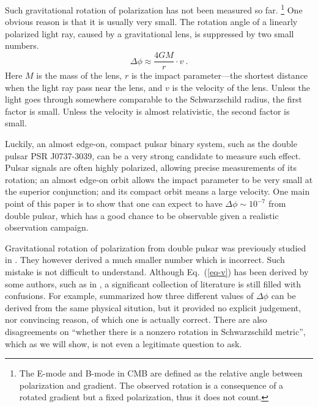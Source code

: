 \documentclass[aps,showpacs,onecolumn,floats,prd,superscriptaddress,nofootinbib]{revtex4}
\begin{document}
Such gravitational rotation of polarization has not been measured so far.
\footnote{The E-mode and B-mode in CMB are defined as the relative angle between polarization and gradient. 
The observed rotation is a consequence of a rotated gradient but a fixed polarization, thus it does not count.} 
One obvious reason is that it is usually very small. 
The rotation angle of a linearly polarized light ray, caused by a gravitational lens, is suppressed by two small numbers.
\begin{equation}
\Delta\phi \approx \frac{4GM}{r} \cdot v~.
\label{eq-v}
\end{equation}
Here $M$ is the mass of the lens, $r$ is the impact parameter---the shortest distance when the light ray pass near the lens, and $v$ is the velocity of the lens.  
Unless the light goes through somewhere comparable to the Schwarzschild radius, the first factor is small. 
Unless the velocity is almost relativistic, the second factor is small. 

Luckily, an almost edge-on, compact pulsar binary system, such as the double pulsar PSR J0737-3039, can be a very strong candidate to measure such effect. 
Pulsar signals are often highly polarized, allowing precise measurements of its rotation; 
an almost edge-on orbit allows the impact parameter to be very small at the superior conjunction; 
and its compact orbit means a large velocity. 
One main point of this paper is to show that one can expect to have $\Delta\phi\sim 10^{-7}$ from double pulsar, which has a good chance to be observable given a realistic observation campaign.

Gravitational rotation of polarization from double pulsar was previously studied in \cite{RugTar06}. 
They however derived a much smaller number which is incorrect. 
Such mistake is not difficult to understand. 
Although Eq.~(\ref{eq-v}) has been derived by some authors, such as in \cite{KopMas01}, a significant collection of literature is still filled with confusions. 
For example, \cite{BroDem11} summarized how three different values of $\Delta\phi$ can be derived from the same physical sitution, but it provided no explicit judgement, nor convincing reason, of which one is actually correct. 
There are also disagreements on ``whether there is a nonzero rotation in Schwarzschild metric'', which as we will show, is not even a legitimate question to ask.
\end{document}
